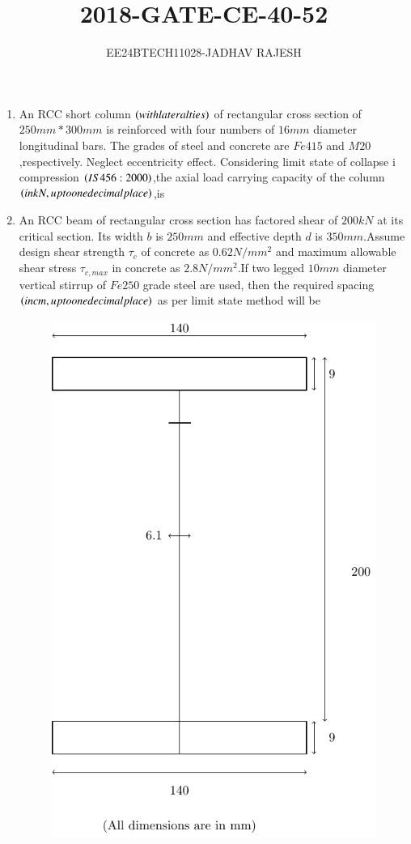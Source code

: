 \documentclass[journal,12pt,twocolumn]{IEEEtran}
\theoremstyle{remark}
\begin{document}

\vspace{3cm}

\title{2018-GATE-CE-40-52}
\author{EE24BTECH11028-JADHAV RAJESH}
\maketitle
\newpage
\bigskip
\begin{enumerate}
    \item An RCC short column $\left(with lateral ties\right)$ of rectangular cross section of $250 mm * 300 mm$ is reinforced with four numbers of $16 mm$ diameter longitudinal bars. The grades of steel and concrete are $Fe415$ and $M20$,respectively. Neglect eccentricity effect. Considering limit state of collapse i  compression $\left(IS 456 : 2000\right)$,the axial load carrying capacity of the column $\left(in kN, up to one decimal place\right)$,is \\
 \item An  RCC beam of rectangular cross section has factored shear of $200 kN$ at its critical section. Its width $b$ is $250 mm$ and effective depth $d$ is $350 mm$.Assume design shear strength $\tau_{c}$ of concrete as $0.62 N/mm^{2}$ and maximum allowable shear stress $\tau_{c,max}$ in concrete as $2.8 N/mm^{2}$.If two legged $10 mm$ diameter vertical stirrup of $Fe250$ grade steel are used, then the required spacing $\left(in cm,up to one decimal place\right)$ as per limit state method will be\\
 \begin{figure}[h!]
         \centering
        \includegraphics[width=0.7\linewidth]{figure/fig1/fig1.pdf}
		\caption{}
        \label{stemplot}


\end{figure}
\end{enumerate}
\end{document}
